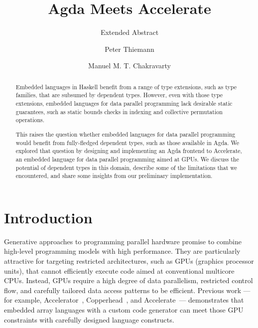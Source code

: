 \documentclass{llncs}
\begin{document}
%
\title{Agda Meets Accelerate}
\subtitle{Extended Abstract}
\author{Peter Thiemann \and Manuel M. T. Chakravarty}

\maketitle              %

\begin{abstract}  
  Embedded languages in Haskell benefit from a range of type extensions, such as type families, that are subsumed by dependent types. However, even with those type extensions, embedded languages for data parallel programming lack desirable static guarantees, such as static bounds checks in indexing and collective permutation operations.
  
  This raises the question whether embedded languages for data parallel programming would benefit from fully-fledged dependent types, such as those available in Agda. We explored that question by designing and implementing an Agda frontend to Accelerate, an embedded language for data parallel programming aimed at GPUs. We discuss the potential of dependent types in this domain, describe some of the limitations that we encountered, and share some insights from our preliminary implementation.
\end{abstract}
\thispagestyle{plain}
\pagestyle{plain}
%
\section{Introduction}
\label{sec:introduction}

Generative approaches to programming parallel hardware promise to
combine high-level programming models with high performance. They are
particularly attractive for targeting restricted architectures, such
as GPUs (graphics processor units), that cannot efficiently execute
code aimed at conventional multicore CPUs. Instead, GPUs require a
high degree of data parallelism, restricted control flow, and
carefully tailored data access patterns to be efficient. Previous work
---for example, Accelerator~\cite{Tarditi:2006},
Copperhead~\cite{Catanzaro:EECS-2010-124}, and
Accelerate~\cite{ChakravartyKellerLeeMcdonellGrover2011}---
demonstrates that embedded array languages with a custom code
generator can meet those GPU constraints with carefully designed language constructs.
\end{document}
